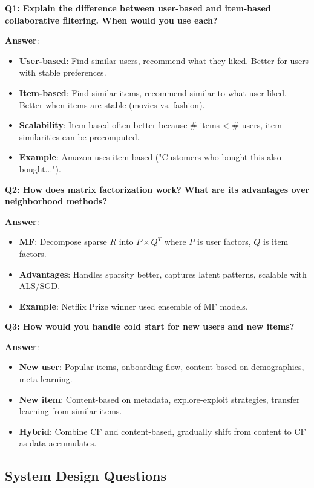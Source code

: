 \documentclass[10pt]{article}
\begin{document}
\textbf{Q1: Explain the difference between user-based and item-based collaborative filtering. When would you use each?}

\textbf{Answer}:
\begin{itemize}[leftmargin=*]
    \item \textbf{User-based}: Find similar users, recommend what they liked. Better for users with stable preferences.
    \item \textbf{Item-based}: Find similar items, recommend similar to what user liked. Better when items are stable (movies vs. fashion).
    \item \textbf{Scalability}: Item-based often better because \# items < \# users, item similarities can be precomputed.
    \item \textbf{Example}: Amazon uses item-based ("Customers who bought this also bought...").
\end{itemize}

\textbf{Q2: How does matrix factorization work? What are its advantages over neighborhood methods?}

\textbf{Answer}:
\begin{itemize}[leftmargin=*]
    \item \textbf{MF}: Decompose sparse $R$ into $P \times Q^T$ where $P$ is user factors, $Q$ is item factors.
    \item \textbf{Advantages}: Handles sparsity better, captures latent patterns, scalable with ALS/SGD.
    \item \textbf{Example}: Netflix Prize winner used ensemble of MF models.
\end{itemize}

\textbf{Q3: How would you handle cold start for new users and new items?}

\textbf{Answer}:
\begin{itemize}[leftmargin=*]
    \item \textbf{New user}: Popular items, onboarding flow, content-based on demographics, meta-learning.
    \item \textbf{New item}: Content-based on metadata, explore-exploit strategies, transfer learning from similar items.
    \item \textbf{Hybrid}: Combine CF and content-based, gradually shift from content to CF as data accumulates.
\end{itemize}

\subsection{System Design Questions}
\end{document}
